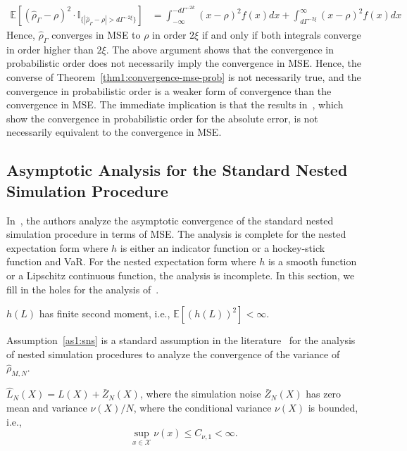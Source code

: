 \begin{align*}
    \mathbb{E} \left[ \left(\hat{\rho}_{\Gamma} - \rho\right)^2 \cdot \mathbb{I}_{\{|\hat{\rho}_{\Gamma} - \rho| > d\Gamma^{-2\xi}\}} \right] 
    & = \int_{-\infty}^{-d\Gamma^{-2k}} (x - \rho)^2 f(x) dx + \int_{d\Gamma^{-2\xi}}^{\infty} (x - \rho)^2 f(x) dx 
\end{align*}
Hence, $\hat{\rho}_{\Gamma}$ converges in MSE to $\rho$ in order $2\xi$ if and only if both integrals converge in order higher than $2\xi$. 
The above argument shows that the convergence in probabilistic order does not necessarily imply the convergence in MSE.
Hence, the converse of Theorem~\ref{thm1:convergence-mse-prob} is not necessarily true, and the convergence in probabilistic order is a weaker form of convergence than the convergence in MSE.
The immediate implication is that the results in~\cite{wang2022smooth}, which show the convergence in probabilistic order for the absolute error, is not necessarily equivalent to the convergence in MSE.

\subsection{Asymptotic Analysis for the Standard Nested Simulation Procedure}
In~\cite{gordy2010nested}, the authors analyze the asymptotic convergence of the standard nested simulation procedure in terms of MSE. 
The analysis is complete for the nested expectation form where $h$ is either an indicator function or a hockey-stick function and VaR. 
For the nested expectation form where $h$ is a smooth function or a Lipschitz continuous function, the analysis is incomplete.
In this section, we fill in the holes for the analysis of~\cite{gordy2010nested}.

\begin{assumption} \label{as1:sns}
    $h(L)$ has finite second moment, i.e., $\mathbb{E} \left[ \left( h(L) \right)^2 \right] < \infty$.
\end{assumption}

Assumption~\ref{as1:sns} is a standard assumption in the literature~\citep{hong2017kernel} for the analysis of nested simulation procedures to analyze the convergence of the variance of $\hat{\rho}_{M, N}$.

\begin{assumption} \label{as1:sns-noise}
    $\hat{L}_N(X) = L(X) + \bar{Z}_N(X)$, where the simulation noise $\bar{Z}_N(X)$ has zero mean and variance $\nu(X) / N$, where the conditional variance $\nu(X)$ is bounded, i.e., 
    $$
        \sup_{x \in \mathcal{X}} \nu(x) \leq C_{\nu, 1} < \infty.
    $$
\end{assumption}

